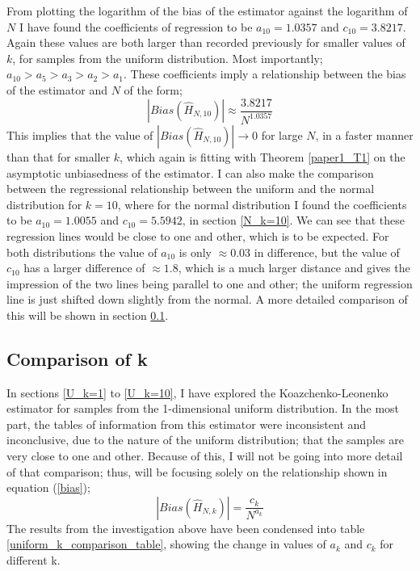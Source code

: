 \documentclass{report}
\begin{document}
From plotting the logarithm of the bias of the estimator against the logarithm of $N$ I have found the coefficients of regression to be $a_{10} = 1.0357$ and $c_{10}=3.8217$. Again these values are both larger than recorded previously for smaller values of $k$, for samples from the uniform distribution. Most importantly; $a_{10} > a_{5} > a_{3} > a_{2} > a_{1}$. These coefficients imply a relationship between the bias of the estimator and $N$ of the form;
\begin{equation}
|Bias(\hat{H}_{N, 10})| \approx \frac{3.8217}{N^{1.0357}}\nonumber
\end{equation}
This implies that the value of $|Bias(\hat{H}_{N, 10})| \to 0$ for large $N$, in a faster manner than that for smaller $k$, which again is fitting with Theorem \ref{paper1_T1} on the asymptotic unbiasedness of the estimator. I can also make the comparison between the regressional relationship between the uniform and the normal distribution for $k=10$, where for the normal distribution I found the coefficients to be $a_{10}=1.0055$ and $c_{10}=5.5942$, in section \ref{N_k=10}. We can see that these regression lines would be close to one and other, which is to be expected. For both distributions the value of $a_{10}$ is only $\approx 0.03$ in difference, but the value of $c_{10}$ has a larger difference of $\approx 1.8$, which is a much larger distance and gives the impression of the two lines being parallel to one and other; the uniform regression line is just shifted down slightly from the normal. A more detailed comparison of this will be shown in section \ref{U_compare_k}.





\subsection{Comparison of k} \label{U_compare_k}
In sections \ref{U_k=1} to \ref{U_k=10}, I have explored the Koazchenko-Leonenko estimator for samples from the 1-dimensional uniform distribution. In the most part, the tables of information from this estimator were inconsistent and inconclusive, due to the nature of the uniform distribution; that the samples are very close to one and other. Because of this, I will not be going into more detail of that comparison; thus, will be focusing solely on the relationship shown in equation (\ref{bias});
\begin{equation}
|Bias(\hat{H}_{N, k})| = \frac{c_{k}}{N^{a_{k}}} \nonumber
\end{equation}
The results from the investigation above have been condensed into table \ref{uniform_k_comparison_table}, showing the change in values of $a_{k}$ and $c_{k}$ for different {k}.
\end{document}
